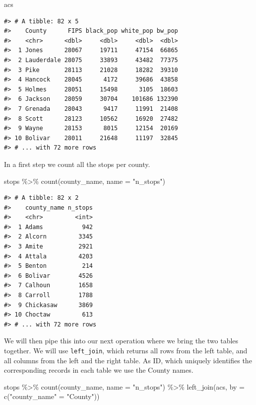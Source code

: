 \documentclass[
]{book}
\newenvironment{Shaded}{\begin{snugshade}}{\end{snugshade}}
\newcommand{\AttributeTok}[1]{\textcolor[rgb]{0.77,0.63,0.00}{#1}}
\newcommand{\FunctionTok}[1]{\textcolor[rgb]{0.00,0.00,0.00}{#1}}
\newcommand{\NormalTok}[1]{#1}
\newcommand{\OtherTok}[1]{\textcolor[rgb]{0.56,0.35,0.01}{#1}}
\newcommand{\SpecialCharTok}[1]{\textcolor[rgb]{0.00,0.00,0.00}{#1}}
\newcommand{\StringTok}[1]{\textcolor[rgb]{0.31,0.60,0.02}{#1}}
\begin{document}
\begin{Shaded}
\begin{Highlighting}[]
\NormalTok{acs}
\end{Highlighting}
\end{Shaded}

\begin{verbatim}
#> # A tibble: 82 x 5
#>    County      FIPS black_pop white_pop bw_pop
#>    <chr>      <dbl>     <dbl>     <dbl>  <dbl>
#>  1 Jones      28067     19711     47154  66865
#>  2 Lauderdale 28075     33893     43482  77375
#>  3 Pike       28113     21028     18282  39310
#>  4 Hancock    28045      4172     39686  43858
#>  5 Holmes     28051     15498      3105  18603
#>  6 Jackson    28059     30704    101686 132390
#>  7 Grenada    28043      9417     11991  21408
#>  8 Scott      28123     10562     16920  27482
#>  9 Wayne      28153      8015     12154  20169
#> 10 Bolivar    28011     21648     11197  32845
#> # ... with 72 more rows
\end{verbatim}

In a first step we count all the stops per county.

\begin{Shaded}
\begin{Highlighting}[]
\NormalTok{stops }\SpecialCharTok{\%\textgreater{}\%} 
  \FunctionTok{count}\NormalTok{(county\_name, }\AttributeTok{name =} \StringTok{"n\_stops"}\NormalTok{) }
\end{Highlighting}
\end{Shaded}

\begin{verbatim}
#> # A tibble: 82 x 2
#>    county_name n_stops
#>    <chr>         <int>
#>  1 Adams           942
#>  2 Alcorn         3345
#>  3 Amite          2921
#>  4 Attala         4203
#>  5 Benton          214
#>  6 Bolivar        4526
#>  7 Calhoun        1658
#>  8 Carroll        1788
#>  9 Chickasaw      3869
#> 10 Choctaw         613
#> # ... with 72 more rows
\end{verbatim}

We will then pipe this into our next operation where we bring the two tables together. We will use \texttt{left\_join}, which returns all rows from the left table, and all columns from the left and the right table. As ID, which uniquely identifies the corresponding records in each table we use the County names.

\begin{Shaded}
\begin{Highlighting}[]
\NormalTok{stops }\SpecialCharTok{\%\textgreater{}\%} 
  \FunctionTok{count}\NormalTok{(county\_name, }\AttributeTok{name =} \StringTok{"n\_stops"}\NormalTok{) }\SpecialCharTok{\%\textgreater{}\%} 
  \FunctionTok{left\_join}\NormalTok{(acs, }\AttributeTok{by =} \FunctionTok{c}\NormalTok{(}\StringTok{"county\_name"} \OtherTok{=} \StringTok{"County"}\NormalTok{)) }
\end{Highlighting}
\end{Shaded}
\end{document}
